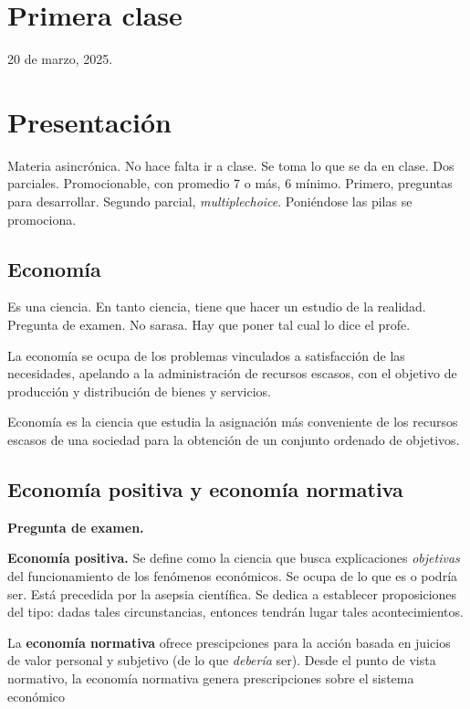 \section{Primera clase}

20 de marzo, 2025.

\section{Presentación}

Materia asincrónica.
No hace falta ir a clase.
Se toma lo que se da en clase.
Dos parciales.
Promocionable, 
con promedio 7 o más,
6 mínimo.
Primero, preguntas para desarrollar.
Segundo parcial, \textit{multiplechoice}.
Poniéndose las pilas se promociona.

\subsection{Economía}

Es una ciencia.
En tanto ciencia, tiene que hacer un estudio de la realidad.
Pregunta de examen.
No sarasa.
Hay que poner tal cual lo dice el profe.

La economía se ocupa de los problemas vinculados a satisfacción de las necesidades,
apelando a la administración de recursos escasos,
con el objetivo de producción y distribución de bienes y servicios.

Economía es la ciencia que estudia la asignación más conveniente 
de los recursos escasos de una sociedad 
para la obtención de un conjunto ordenado de objetivos.

\subsection{Economía positiva y economía normativa}

\textbf{Pregunta de examen.}

\textbf{Economía positiva.}
Se define como
la ciencia que busca explicaciones \textit{objetivas} del funcionamiento de los fenómenos económicos.
Se ocupa de lo que es o podría ser.
Está precedida por la asepsia científica.
Se dedica a establecer proposiciones del tipo:
dadas tales circunstancias,
entonces tendrán lugar tales acontecimientos.

La \textbf{economía normativa} ofrece prescipciones para la acción
basada en juicios de valor personal y subjetivo
(de lo que \textit{debería} ser).
Desde el punto de vista normativo, 
la economía normativa genera prescripciones
sobre el sistema económico

